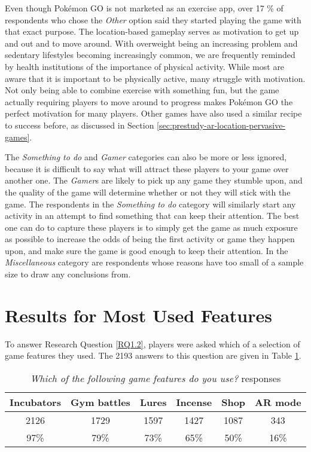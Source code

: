 Even though Pokémon GO is not marketed as an exercise app, over 17 \% of respondents who chose the \emph{Other} option said they started playing the game with that exact purpose. The location-based gameplay serves as motivation to get up and out and to move around. With overweight being an increasing problem and sedentary lifestyles becoming increasingly common, we are frequently reminded by health institutions of the importance of physical activity. While most are aware that it is important to be physically active, many struggle with motivation. Not only being able to combine exercise with something fun, but the game actually requiring players to move around to progress makes Pokémon GO the perfect motivation for many players. Other games have also used a similar recipe to success before, as discussed in Section \ref{sec:prestudy-ar-location-pervasive-games}.

The \emph{Something to do} and \emph{Gamer} categories can also be more or less ignored, because it is difficult to say what will attract these players to your game over another one. The \emph{Gamer}s are likely to pick up any game they stumble upon, and the quality of the game will determine whether or not they will stick with the game. The respondents in the \emph{Something to do} category will similarly start any activity in an attempt to find something that can keep their attention. The best one can do to capture these players is to simply get the game as much exposure as possible to increase the odds of being the first activity or game they happen upon, and make sure the game is good enough to keep their attention. In the \emph{Miscellaneous} category are respondents whose reasons have too small of a sample size to draw any conclusions from.


\section{Results for Most Used Features}
\label{sec:success-factors-features}

To answer Research Question \ref{RQ1.2}, players were asked which of a selection of game features they used. The 2193 answers to this question are given in Table \ref{tbl:pokemon-go-features-used}.

\begin{table}[h]
	\centering
	\caption{\emph{Which of the following game features do you use?} responses}
	\label{tbl:pokemon-go-features-used}
	\begin{tabular}{|c|c|c|c|c|c|}
		\hline
		\textbf{Incubators} & \textbf{Gym battles} & \textbf{Lures} & \textbf{Incense} & \textbf{Shop} & \textbf{AR mode}\\
		\hline\hline
		2126	& 1729	& 1597	& 1427	& 1087	& 343\\
		97\%	& 79\%	& 73\%	& 65\%	& 50\%	& 16\%\\\hline
	\end{tabular}
\end{table}

